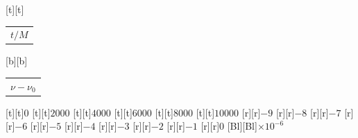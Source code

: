 %    
%
%
\begin{psfrags}%
\psfragscanon%
%
[t][t]{\color[rgb]{0,0,0}\setlength{\tabcolsep}{0pt}\begin{tabular}{c}{\Large$t/M$}\end{tabular}}%
[b][b]{\color[rgb]{0,0,0}\setlength{\tabcolsep}{0pt}\begin{tabular}{c}{\Large$\nu - \nu_0$}\end{tabular}}%
%
[t][t]{$0$}%
[t][t]{$2000$}%
[t][t]{$4000$}%
[t][t]{$6000$}%
[t][t]{$8000$}%
[t][t]{$10000$}%
%
[r][r]{$-9$}%
[r][r]{$-8$}%
[r][r]{$-7$}%
[r][r]{$-6$}%
[r][r]{$-5$}%
[r][r]{$-4$}%
[r][r]{$-3$}%
[r][r]{$-2$}%
[r][r]{$-1$}%
[r][r]{$0$}%
[Bl][Bl]{$\times 10^{-6}$}%
%
%
\end{psfrags}%
%
